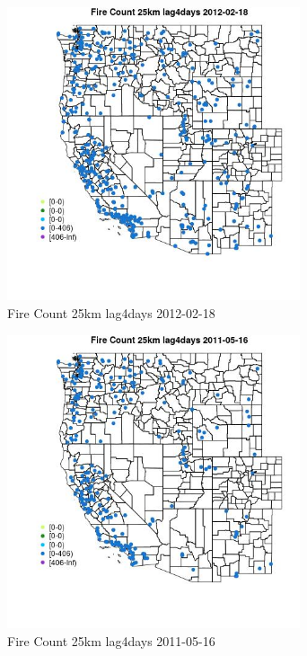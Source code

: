 \begin{figure} 
\centering  
\includegraphics[width=0.77\textwidth]{Code_Outputs/Report_ML_input_PM25_Step4_part_f_de_duplicated_aveswNAs_MapObsFire_Count_25km_lag4days2012-02-18.jpg} 
\caption{\label{fig:Report_ML_input_PM25_Step4_part_f_de_duplicated_aveswNAsMapObsFire_Count_25km_lag4days2012-02-18}Fire Count 25km lag4days 2012-02-18} 
\end{figure} 
 

\begin{figure} 
\centering  
\includegraphics[width=0.77\textwidth]{Code_Outputs/Report_ML_input_PM25_Step4_part_f_de_duplicated_aveswNAs_MapObsFire_Count_25km_lag4days2011-05-16.jpg} 
\caption{\label{fig:Report_ML_input_PM25_Step4_part_f_de_duplicated_aveswNAsMapObsFire_Count_25km_lag4days2011-05-16}Fire Count 25km lag4days 2011-05-16} 
\end{figure} 
 

